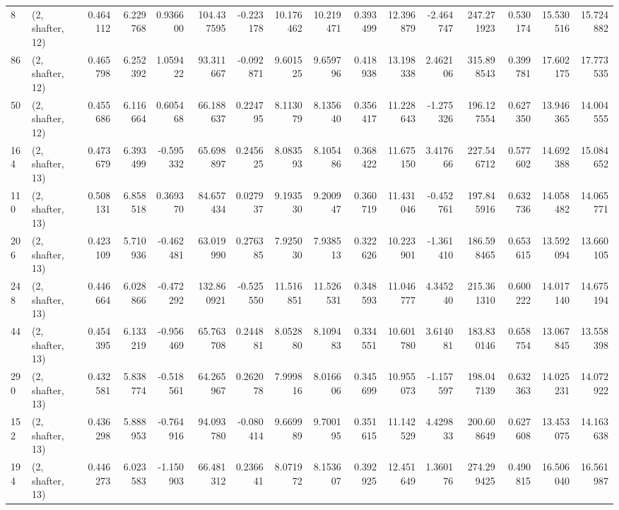 \begin{tabular}{llrrrrrrrrrrrrrr}
8   &  (2, shafter, 12) &   0.464112 &   6.229768 &   0.936600 &   104.437595 &  -0.223178 &  10.176462 &  10.219471 &  0.393499 &  12.396879 &  -2.464747 &    247.271923 &    0.530174 &   15.530516 &   15.724882 \\
86  &  (2, shafter, 12) &   0.465798 &   6.252392 &   1.059422 &    93.311667 &  -0.092871 &   9.601525 &   9.659796 &  0.418938 &  13.198338 &   2.462106 &    315.898543 &    0.399781 &   17.602175 &   17.773535 \\
50  &  (2, shafter, 12) &   0.455686 &   6.116664 &   0.605468 &    66.188637 &   0.224795 &   8.113079 &   8.135640 &  0.356417 &  11.228643 &  -1.275326 &    196.127554 &    0.627350 &   13.946365 &   14.004555 \\
164 &  (2, shafter, 13) &   0.473679 &   6.393499 &  -0.595332 &    65.698897 &   0.245625 &   8.083593 &   8.105486 &  0.368422 &  11.675150 &   3.417666 &    227.546712 &    0.577602 &   14.692388 &   15.084652 \\
110 &  (2, shafter, 13) &   0.508131 &   6.858518 &   0.369370 &    84.657434 &   0.027937 &   9.193530 &   9.200947 &  0.360719 &  11.431046 &  -0.452761 &    197.845916 &    0.632736 &   14.058482 &   14.065771 \\
206 &  (2, shafter, 13) &   0.423109 &   5.710936 &  -0.462481 &    63.019990 &   0.276385 &   7.925030 &   7.938513 &  0.322626 &  10.223901 &  -1.361410 &    186.598465 &    0.653615 &   13.592094 &   13.660105 \\
248 &  (2, shafter, 13) &   0.446664 &   6.028866 &  -0.472292 &   132.860921 &  -0.525550 &  11.516851 &  11.526531 &  0.348593 &  11.046777 &   4.345240 &    215.361310 &    0.600222 &   14.017140 &   14.675194 \\
44  &  (2, shafter, 13) &   0.454395 &   6.133219 &  -0.956469 &    65.763708 &   0.244881 &   8.052880 &   8.109483 &  0.334551 &  10.601780 &   3.614081 &    183.830146 &    0.658754 &   13.067845 &   13.558398 \\
290 &  (2, shafter, 13) &   0.432581 &   5.838774 &  -0.518561 &    64.265967 &   0.262078 &   7.999816 &   8.016606 &  0.345699 &  10.955073 &  -1.157597 &    198.047139 &    0.632363 &   14.025231 &   14.072922 \\
152 &  (2, shafter, 13) &   0.436298 &   5.888953 &  -0.764916 &    94.093780 &  -0.080414 &   9.669989 &   9.700195 &  0.351615 &  11.142529 &   4.429833 &    200.608649 &    0.627608 &   13.453075 &   14.163638 \\
194 &  (2, shafter, 13) &   0.446273 &   6.023583 &  -1.150903 &    66.481312 &   0.236641 &   8.071972 &   8.153607 &  0.392925 &  12.451649 &   1.360176 &    274.299425 &    0.490815 &   16.506040 &   16.561987 \\

\end{tabular}
